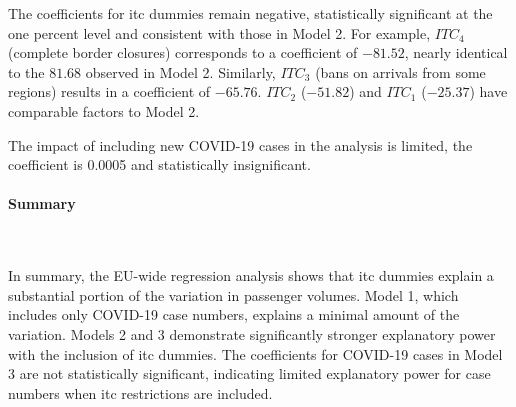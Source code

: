 \documentclass[12pt,onehalfspacing,headsepline,oneside,openright,a4paper, fleqn]{report}
\begin{document}
The coefficients for \gls{itc} dummies remain negative, statistically significant at the one percent level and consistent with those in Model 2. For example, $ITC_4$ (complete border closures) corresponds to a coefficient of $-81.52$, nearly identical to the $81.68$ observed in Model 2. Similarly, $ITC_3$ (bans on arrivals from some regions) results in a coefficient of $-65.76$. $ITC_2$ ($-51.82$) and $ITC_1$ ($-25.37$) have comparable factors to Model 2.

The impact of including new COVID-19 cases in the analysis is limited, the coefficient is 0.0005 and statistically insignificant.



\paragraph{Summary}
\

In summary, the EU-wide regression analysis shows that \gls{itc} dummies explain a substantial portion of the variation in passenger volumes. Model 1, which includes only COVID-19 case numbers, explains a minimal amount of the variation. Models 2 and 3 demonstrate significantly stronger explanatory power with the inclusion of \gls{itc} dummies. The coefficients for COVID-19 cases in Model 3 are not statistically significant, indicating limited explanatory power for case numbers when \gls{itc} restrictions are included.
\end{document}
